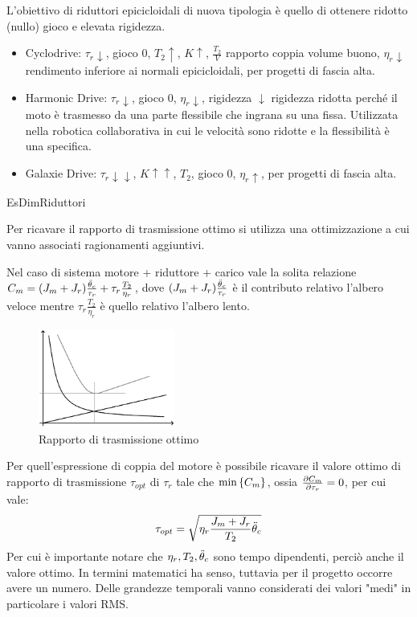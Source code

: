 L'obiettivo di riduttori epicicloidali di nuova tipologia è quello di ottenere ridotto (nullo) gioco e elevata rigidezza.
\begin{itemize}
    \item Cyclodrive: \( \tau_r \downarrow \), gioco 0, \( T_2 \uparrow \), \( K \uparrow \), \( \frac{T_2}{V} \) rapporto coppia volume buono, \( \eta_r \downarrow \) rendimento inferiore ai normali epicicloidali, per progetti di fascia alta.
    \item Harmonic Drive: \( \tau_r \downarrow \), gioco 0, \( \eta_r \downarrow \), rigidezza \( \downarrow \) rigidezza ridotta perché il moto è trasmesso da una parte flessibile che ingrana su una fissa. Utilizzata nella robotica collaborativa in cui le velocità sono ridotte e la flessibilità è una specifica.
    \item Galaxie Drive: \( \tau_r \downarrow\downarrow\), \( K \uparrow\uparrow \), \( T_2 \), gioco 0, \( \eta_r \uparrow \), per progetti di fascia alta.
\end{itemize}\label{riduttori_speciali}

{EsDimRiduttori}

 \label{tau_ottimo}
Per ricavare il rapporto di trasmissione ottimo si utilizza una ottimizzazione a cui vanno associati ragionamenti aggiuntivi.

Nel caso di sistema motore + riduttore + carico vale la solita relazione \(C_m = (J_m+J_r)\frac{\Ddot{\theta}_c}{\tau_r} + \tau_r \frac{T_2}{\eta_r}\), dove \((J_m+J_r)\frac{\Ddot{\theta}_c}{\tau_r}\) è il contributo relativo l'albero veloce mentre \(\tau_r \frac{T_2}{\eta_r}\) è quello relativo l'albero lento.

\begin{figure}[h]
    \centering
    \includegraphics[width=0.4\textwidth]{Immagini/CoppiaTauRott.png}
    \caption{Rapporto di trasmissione ottimo}
\end{figure}


Per quell'espressione di coppia del motore è possibile ricavare il valore ottimo di rapporto di trasmissione \(\tau_{opt}\) di \(\tau_r\) tale che \(\operatorname{min}\left\{ C_m \right\}\), ossia \(\frac{\partial C_m}{\partial \tau_r} = 0\), per cui vale:
\[ \tau_{opt} = \sqrt{\eta_r \frac{J_m + J_r}{T_2}\Ddot{\theta}_c} \]
Per cui è importante notare che \(\eta_r, T_2, \Ddot{\theta}_c\) sono tempo dipendenti, perciò anche il valore ottimo. In termini matematici ha senso, tuttavia per il progetto occorre avere un numero.
Delle grandezze temporali vanno considerati dei valori "medi" in particolare i valori RMS.

